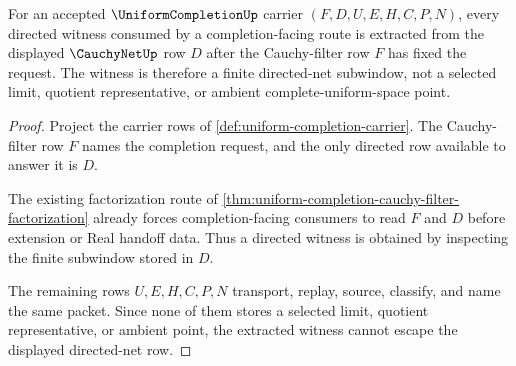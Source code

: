 \begin{theorem}
\label{thm:uniform-completion-directed-net-witness}
For an accepted $\UniformCompletionUp$ carrier $(F,D,U,E,H,C,P,N)$, every
directed witness consumed by a completion-facing route is extracted from the
displayed $\CauchyNetUp$ row $D$ after the Cauchy-filter row $F$ has fixed the
request. The witness is therefore a finite directed-net subwindow, not a
selected limit, quotient representative, or ambient complete-uniform-space
point.
\end{theorem}
\begin{proof}
Project the carrier rows of \autoref{def:uniform-completion-carrier}. The
Cauchy-filter row $F$ names the completion request, and the only directed row
available to answer it is $D$.

The existing factorization route of
\autoref{thm:uniform-completion-cauchy-filter-factorization} already forces
completion-facing consumers to read $F$ and $D$ before extension or Real handoff
data. Thus a directed witness is obtained by inspecting the finite subwindow
stored in $D$.

The remaining rows $U,E,H,C,P,N$ transport, replay, source, classify, and name
the same packet. Since none of them stores a selected limit, quotient
representative, or ambient point, the extracted witness cannot escape the
displayed directed-net row.
\end{proof}

